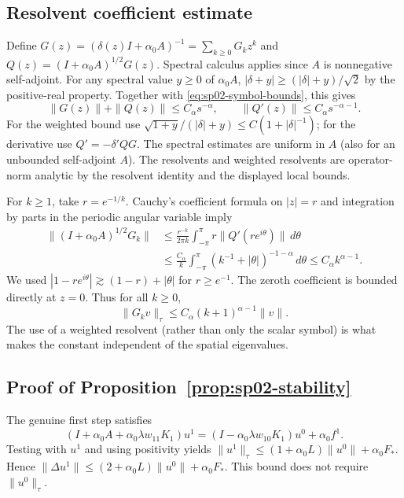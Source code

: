 \documentclass[11pt,a4paper]{amsart}
\theoremstyle{remark}
\theoremstyle{plain}
\theoremstyle{remark}
\numberwithin{equation}{section}
\begin{document}
\subsection{Resolvent coefficient estimate}
Define $G(z)=(\delta(z)I+\alpha_0 A)^{-1}=\sum_{k\ge0}G_kz^k$ and $Q(z)=(I+\alpha_0 A)^{1/2}G(z)$. Spectral calculus applies since $A$ is nonnegative self-adjoint. For any spectral value $y\ge0$ of $\alpha_0 A$, $|\delta+y|\ge(|\delta|+y)/\sqrt2$ by the positive-real property. Together with \eqref{eq:sp02-symbol-bounds}, this gives
\[
 \|G(z)\|+\|Q(z)\|\le C_\alpha s^{-\alpha},\qquad
 \|Q'(z)\|\le C_\alpha s^{-\alpha-1}.
\]
For the weighted bound use $\sqrt{1+y}/(|\delta|+y)\le C(1+|\delta|^{-1})$; for the derivative use $Q'=-\delta' QG$. The spectral estimates are uniform in $A$ (also for an unbounded self-adjoint $A$). The resolvents and weighted resolvents are operator-norm analytic by the resolvent identity and the displayed local bounds.

For $k\ge1$, take $r=e^{-1/k}$. Cauchy's coefficient formula on $|z|=r$ and integration by parts in the periodic angular variable imply
\begin{align*}
 \|(I+\alpha_0 A)^{1/2}G_k\|
 &\le \frac{r^{-k}}{2\pi k}\int_{-\pi}^{\pi}r\|Q'(re^{i\theta})\|\,d\theta\\
 &\le \frac{C_\alpha}{k}\int_{-\pi}^{\pi}(k^{-1}+|\theta|)^{-1-\alpha}\,d\theta
 \le C_\alpha k^{\alpha-1}.
\end{align*}
We used $|1-re^{i\theta}|\gtrsim(1-r)+|\theta|$ for $r\ge e^{-1}$. The zeroth coefficient is bounded directly at $z=0$. Thus for all $k\ge0$,
\begin{equation}\label{eq:sp02-green}
 \|G_k v\|_\tau\le C_\alpha(k+1)^{\alpha-1}\|v\|.
\end{equation}
The use of a weighted resolvent (rather than only the scalar symbol) is what makes the constant independent of the spatial eigenvalues.

\subsection{Proof of Proposition~\ref{prop:sp02-stability}}
The genuine first step satisfies
\[
 (I+\alpha_0 A+\alpha_0\lambda w_{11}K_1)u^1
 =(I-\alpha_0\lambda w_{10}K_1)u^0+\alpha_0 f^1.
\]
Testing with $u^1$ and using positivity yields $\|u^1\|_\tau\le (1+\alpha_0 L)\|u^0\|+\alpha_0 F_*$. Hence $\|\Delta u^1\|\le (2+\alpha_0 L)\|u^0\|+\alpha_0 F_*$. This bound does not require $\|u^0\|_\tau$.
\end{document}
